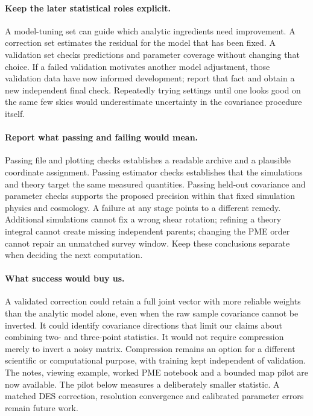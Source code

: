 \documentclass[11pt]{article}
\begin{document}
\paragraph{Keep the later statistical roles explicit.}
A model-tuning set can guide which analytic ingredients need improvement.
A correction set estimates the residual for the model that has been fixed.
A validation set checks predictions and parameter coverage without changing
that choice. If a failed validation motivates another model adjustment,
those validation data have now informed development; report that fact and
obtain a new independent final check. Repeatedly trying settings until one
looks good on the same few skies would underestimate uncertainty in the
covariance procedure itself.

\paragraph{Report what passing and failing would mean.}
Passing file and plotting checks establishes a readable archive and a
plausible coordinate assignment. Passing estimator checks establishes that
the simulations and theory target the same measured quantities. Passing
held-out covariance and parameter checks supports the proposed precision
within that fixed simulation physics and cosmology. A failure at any stage
points to a different remedy. Additional simulations cannot fix a wrong
shear rotation; refining a theory integral cannot create missing independent
parents; changing the PME order cannot repair an unmatched survey window.
Keep these conclusions separate when deciding the next computation.

\paragraph{What success would buy us.}
A validated correction could retain a full joint vector with more reliable
weights than the analytic model alone, even when the raw sample covariance
cannot be inverted. It could identify covariance directions that limit our
claims about combining two- and three-point statistics. It would not require
compression merely to invert a noisy matrix. Compression remains an option
for a different scientific or computational purpose, with training kept
independent of validation. The notes, viewing example, worked PME notebook and a bounded map pilot
are now available. The pilot below measures a deliberately smaller statistic.
A matched DES correction, resolution convergence and calibrated parameter
errors remain future work.
\end{document}
